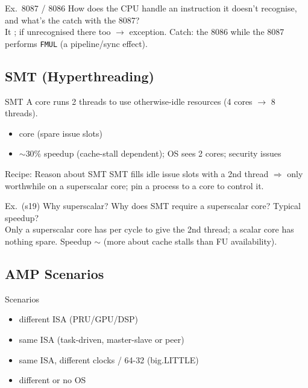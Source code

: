 \begin{example2}{Ex.\ 8087 / 8086}
    How does the CPU handle an instruction it doesn't recognise, and what's the catch with the 8087?
     \\ 
    It ; if unrecognised there too $\to$ exception. Catch: the 8086  while the 8087 performs \texttt{FMUL} (a pipeline/sync effect).
\end{example2}

\subsection{SMT (Hyperthreading)}

\begin{concept}{SMT}
    A core runs 2 threads to use otherwise-idle resources (4 cores $\to$ 8 threads).
    \begin{itemize}
        \item {} core (spare issue slots)
        \item $\sim$30\% speedup (cache-stall dependent); OS sees 2 cores; security issues
    \end{itemize}
\end{concept}

\begin{KR}{Recipe: Reason about SMT}
    SMT fills idle issue slots with a 2nd thread $\Rightarrow$ only worthwhile on a superscalar core; pin a process to a core to control it.
\end{KR}

\begin{example2}{Ex.\ (s19) Why superscalar?}
    Why does SMT require a superscalar core? Typical speedup?
     \\ 
    Only a superscalar core has  per cycle to give the 2nd thread; a scalar core has nothing spare. Speedup $\sim$ (more about cache stalls than FU availability).
\end{example2}

\raggedcolumns
\columnbreak

\subsection{AMP Scenarios}


\begin{definition}{Scenarios}
    \begin{itemize}
        \item different ISA (PRU/GPU/DSP)
        \item same ISA (task-driven, master-slave or peer)
        \item same ISA, different clocks / 64-32 (big.LITTLE)
        \item different or no OS
    \end{itemize}
\end{definition}

